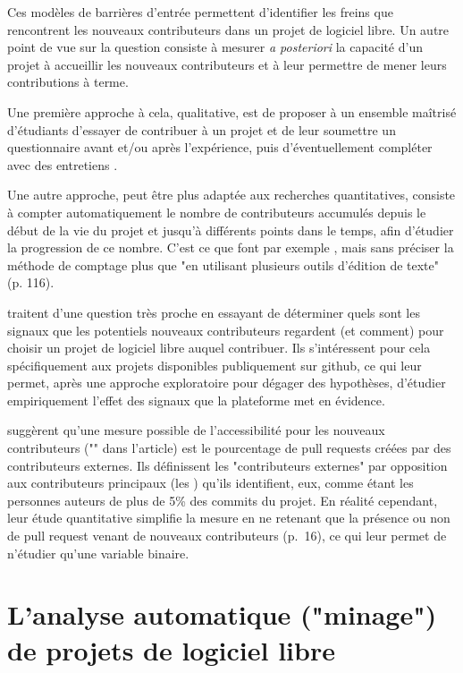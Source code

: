 Ces modèles de barrières d'entrée permettent d'identifier les freins que rencontrent les nouveaux
contributeurs dans un projet de logiciel libre. Un autre point de vue sur la question consiste à mesurer
\emph{a posteriori} la capacité d'un projet à accueillir les nouveaux contributeurs et à leur permettre de
mener leurs contributions à terme.

Une première approche à cela, qualitative, est de proposer à un ensemble maîtrisé d'étudiants d'essayer de
contribuer à un projet et de leur soumettre un questionnaire avant et/ou après l'expérience, puis
d'éventuellement compléter avec des entretiens
\parencites{newcomers-accessibility-2016}{newcomers-onboarding-2018}[voir aussi][]{newcomers-adaptation-2005}.

Une autre approche, peut être plus adaptée aux recherches quantitatives, consiste à compter automatiquement le
nombre de contributeurs accumulés depuis le début de la vie du projet et jusqu'à différents points dans le
temps, afin d'étudier la progression de ce nombre. C'est ce que font par exemple
, mais sans préciser la méthode de comptage plus que "en utilisant
plusieurs outils d'édition de texte" (p. 116).

 traitent d'une question très proche en essayant de déterminer quels sont les
signaux que les potentiels nouveaux contributeurs regardent (et comment) pour choisir un projet de logiciel
libre auquel contribuer. Ils s'intéressent pour cela spécifiquement aux projets disponibles publiquement sur
\gls{github}, ce qui leur permet, après une approche exploratoire pour dégager des hypothèses, d'étudier
empiriquement l'effet des signaux que la plateforme met en évidence.

 suggèrent qu'une mesure possible de l'accessibilité pour les nouveaux
contributeurs ("" dans l'article) est le pourcentage de \glspl{pull request} créées par
des contributeurs externes. Ils définissent les "contributeurs externes" par opposition aux contributeurs
principaux (les ) qu'ils identifient, eux, comme étant les personnes auteurs de plus de
5\% des \glspl{commit} du projet. En réalité cependant, leur étude quantitative simplifie la mesure en ne
retenant que la présence ou non de \gls{pull request} venant de nouveaux contributeurs (p.~16), ce qui leur
permet de n'étudier qu'une variable binaire.

\section{L'analyse automatique ("minage") de projets de logiciel libre}

